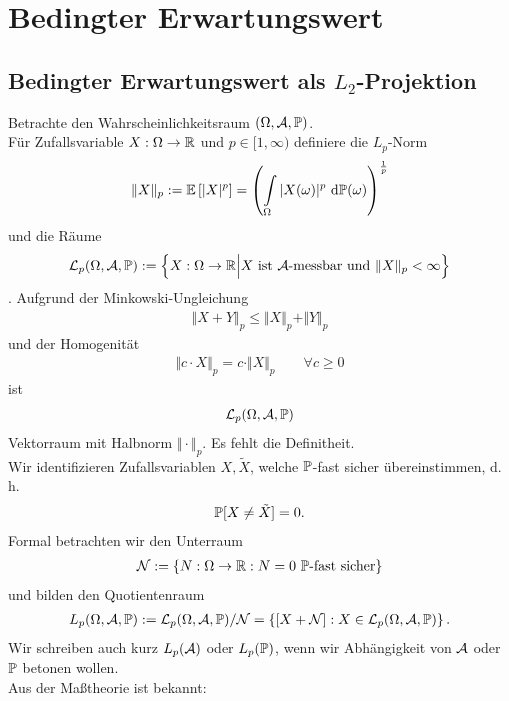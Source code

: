 
\chapter{Bedingter Erwartungswert}
\section{Bedingter Erwartungswert als $L_2$-Projektion}
Betrachte den Wahrscheinlichkeitsraum $(\Omega,\A,\P)$.\\
Für Zufallsvariable $X:\Omega\to\R$ und $p\in[1,\infty)$ definiere die $L_p$-Norm
\begin{align*}
\Vert X\Vert_p:=\E\left[|X|^p\right]=\left(\int\limits_\Omega|X(\omega)|^p\d\P(\omega)\right)^{\frac{1}{p}}
\end{align*}
und die Räume
\begin{align*}
\mathcal{L}_p(\Omega,\A,\P):=\Big\lbrace X:\Omega\to\R\Big|X\text{ ist $\A$-messbar und }\Vert X\Vert_p<\infty\Big\rbrace
\end{align*}.
Aufgrund der Minkowski-Ungleichung
\begin{align*}
\Vert X+Y\Vert_p\leq\Vert X\Vert_p+\Vert Y\Vert_p
\end{align*}
und der Homogenität
\begin{align*}
\Vert c\cdot X\Vert_p=c\cdot\Vert X\Vert_p\qquad\forall c\geq0
\end{align*}
ist 
\begin{align*}
\mathcal{L}_p(\Omega,\A,\P)
\end{align*}
Vektorraum mit Halbnorm $\Vert\cdot\Vert_p$. Es fehlt die Definitheit.\\
Wir identifizieren Zufallsvariablen $X,\tilde{X}$, welche $\P$-fast sicher übereinstimmen, d. h. 
\begin{align*}
\P[X\neq\tilde{X}]=0.
\end{align*}
Formal betrachten wir den Unterraum
\begin{align*}
\mathcal{N}:=\lbrace N:\Omega\to\R:N=0\text{ $\P$-fast sicher}\rbrace
\end{align*}
und bilden den Quotientenraum
\begin{align*}
L_p(\Omega,\A,\P):=\mathcal{L}_p(\Omega,\A,\P)/\mathcal{N}=\left\lbrace[X+\mathcal{N}]:X\in\mathcal{L}_p(\Omega,\A,\P)\right\rbrace.
\end{align*}
Wir schreiben auch kurz $L_p(\A)$ oder $L_p(\P)$, wenn wir Abhängigkeit von $\A$ oder $\P$ betonen wollen.\\
Aus der Maßtheorie ist bekannt:


